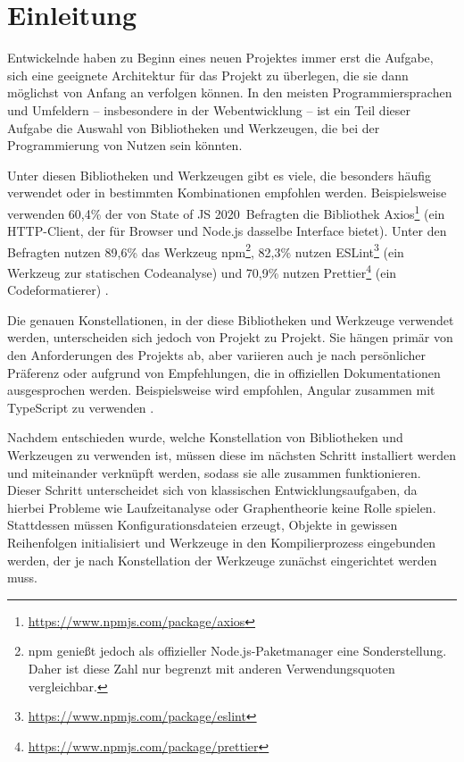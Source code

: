 \section{Einleitung}
Entwickelnde haben zu Beginn eines neuen Projektes immer erst die Aufgabe, sich eine geeignete Architektur für das Projekt zu überlegen, die sie dann möglichst von Anfang an verfolgen können. In den meisten Programmiersprachen und Umfeldern -- insbesondere in der Webentwicklung -- ist ein Teil dieser Aufgabe die Auswahl von Bibliotheken und Werkzeugen, die bei der Programmierung von Nutzen sein könnten.

Unter diesen Bibliotheken und Werkzeugen gibt es viele, die besonders häufig verwendet oder in bestimmten Kombinationen empfohlen werden. Beispielsweise verwenden 60,4\% der von \glqq State of JS 2020\grqq\ Befragten die Bibliothek Axios\footnote{\url{https://www.npmjs.com/package/axios}} (ein HTTP-Client, der für Browser und Node.js dasselbe Interface bietet). Unter den Befragten nutzen 89,6\% das Werkzeug \gls{npm}\footnote{\gls{npm} genießt jedoch als offizieller Node.js-Paketmanager eine Sonderstellung. Daher ist diese Zahl nur begrenzt mit anderen Verwendungsquoten vergleichbar.}, 82,3\% nutzen ESLint\footnote{\url{https://www.npmjs.com/package/eslint}} (ein Werkzeug zur statischen Codeanalyse) und 70,9\% nutzen Prettier\footnote{\url{https://www.npmjs.com/package/prettier}} (ein Codeformatierer) \cite{stateofjs}.

Die genauen Konstellationen, in der diese Bibliotheken und Werkzeuge verwendet werden, unterscheiden sich jedoch von Projekt zu Projekt. Sie hängen primär von den Anforderungen des Projekts ab, aber variieren auch je nach persönlicher Präferenz oder aufgrund von Empfehlungen, die in offiziellen Dokumentationen ausgesprochen werden. Beispielsweise wird empfohlen, Angular zusammen mit TypeScript zu verwenden \cite{angular_only_with_typescript}.

Nachdem entschieden wurde, welche Konstellation von Bibliotheken und Werkzeugen zu verwenden ist, müssen diese im nächsten Schritt installiert werden und miteinander verknüpft werden, sodass sie alle zusammen funktionieren. Dieser Schritt unterscheidet sich von klassischen Entwicklungsaufgaben, da hierbei Probleme wie Laufzeitanalyse oder Graphentheorie keine Rolle spielen. Stattdessen müssen Konfigurationsdateien erzeugt, Objekte in gewissen Reihenfolgen initialisiert und Werkzeuge in den Kompilierprozess eingebunden werden, der je nach Konstellation der Werkzeuge zunächst eingerichtet werden muss.

